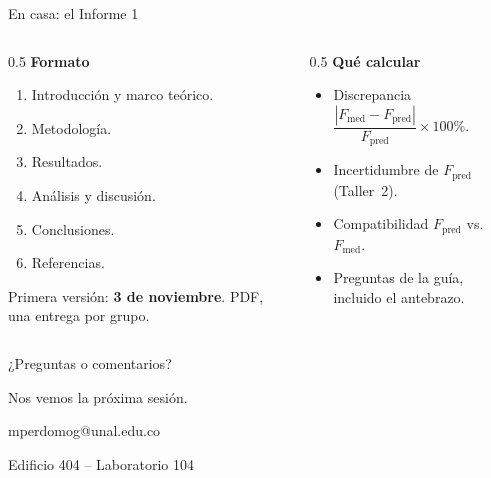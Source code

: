 \documentclass[aspectratio=169,xcolor=dvipsnames]{beamer}
\begin{document}
	\begin{frame}{En casa: el Informe 1}
		\begin{columns}[T]
			\begin{column}{0.5\textwidth}
				\textbf{Formato}
				\begin{enumerate}
					\item Introducción y marco teórico.
					\item Metodología.
					\item Resultados.
					\item Análisis y discusión.
					\item Conclusiones.
					\item Referencias.
				\end{enumerate}
				\vspace{0.2cm}
				Primera versión: \textbf{3 de noviembre}. PDF, una entrega por grupo.
			\end{column}
			\begin{column}{0.5\textwidth}
				\textbf{Qué calcular}
				\begin{itemize}
					\item Discrepancia
					$\dfrac{|F_{\text{med}}-F_{\text{pred}}|}{F_{\text{pred}}}\times 100\%$.
					\item Incertidumbre de $F_{\text{pred}}$ (Taller~2).
					\item Compatibilidad $F_{\text{pred}}$ vs.\ $F_{\text{med}}$.
					\item Preguntas de la guía, incluido el antebrazo.
				\end{itemize}
			\end{column}
		\end{columns}
	\end{frame}
	
	\begin{frame}{¿Preguntas o comentarios?}
		\begin{center}
			\vspace{0.5cm}
			\Large Nos vemos la próxima sesión.
			
			\vspace{0.8cm}
			\normalsize
			mperdomog@unal.edu.co
			
			\vspace{0.2cm}
			Edificio 404 -- Laboratorio 104
		\end{center}
	\end{frame}
	
\end{document}

